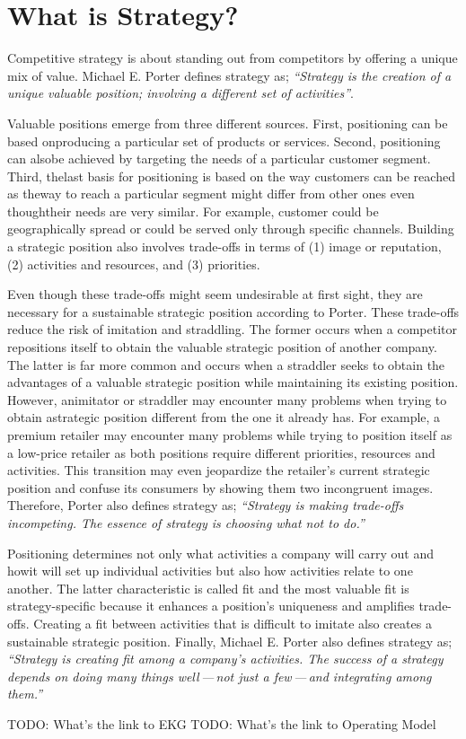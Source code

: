 \section*{What is Strategy?}

Competitive strategy is about standing out from competitors by offering a unique mix of value.
Michael E. Porter defines strategy as;
\textit{“Strategy is the creation of a unique valuable position; involving a different set of activities”}\autocite{whatisstrategy}.

Valuable positions emerge from three different sources.
First, positioning can be based onproducing a particular set of products or services.
Second, positioning can alsobe achieved by targeting the needs of a particular customer segment.
Third, thelast basis for positioning is based on the way customers can be reached as theway to reach a
particular segment might differ from other ones even thoughtheir needs are very similar.
For example, customer could be geographically spread or could be served only through specific channels.
Building a strategic position also involves trade-offs in terms of
(1) image or reputation,
(2) activities and resources, and
(3) priorities.

Even though these trade-offs might seem undesirable at first sight,
they are necessary for a sustainable strategic position according to Porter.
These trade-offs reduce the risk of imitation and straddling.
The former occurs when a competitor repositions itself to obtain the valuable strategic position of another company.
The latter is far more common and occurs when a straddler seeks to obtain the advantages of
a valuable strategic position while maintaining its existing position.
However, animitator or straddler may encounter many problems when trying to obtain astrategic position
different from the one it already has.
For example, a premium retailer may encounter many problems while trying to position itself as a low-price retailer
as both positions require different priorities, resources and activities.
This transition may even jeopardize the retailer’s current strategic position and confuse its consumers
by showing them two incongruent images.
Therefore, Porter also defines strategy as;
\textit{“Strategy is making trade-offs incompeting. The essence of strategy is choosing what not to do.”}

Positioning determines not only what activities a company will carry out and howit will set up individual
activities but also how activities relate to one another.
The latter characteristic is called fit and the most valuable fit is strategy-specific because it enhances a
position’s uniqueness and amplifies trade-offs.
Creating a fit between activities that is difficult to imitate also creates a sustainable strategic position.
Finally, Michael E. Porter also defines strategy as;
\textit{“Strategy is creating fit among a company’s activities.
The success of a strategy depends on doing many things well\,---\,not just a few\,---\,and
integrating among them.”}

TODO: What's the link to EKG
TODO: What's the link to Operating Model
